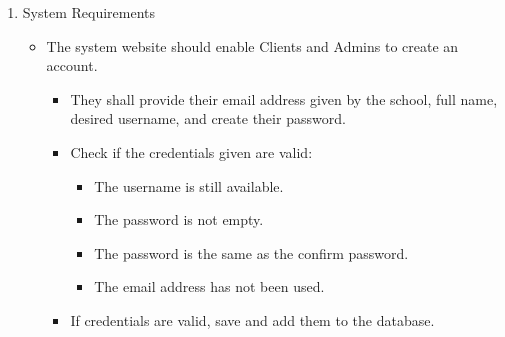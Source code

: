 \begin{enumerate}
	\item System Requirements 
		\begin{itemize}
		\item The system website should enable Clients and Admins to create an account. 
			\begin{itemize}
			\item They shall provide their email address given by the school, full name, desired username, and create their password. 
			\item Check if the credentials given are valid: 
				\begin{itemize}
				\item The username is still available. 
				\item The password is not empty. 
				\item The password is the same as the confirm password. 
				\item The email address has not been used. 
				\end{itemize}
		\item If credentials are valid, save and add them to the database. 
		\end{itemize}


\end{itemize}
\end{enumerate}
